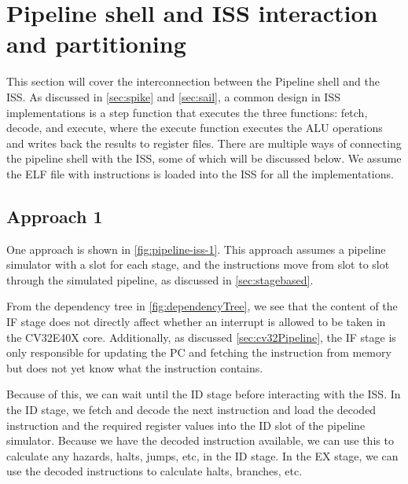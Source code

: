 



\section{Pipeline shell and ISS interaction and partitioning}
\label{sec:shell_iss_interaction}

This section will cover the interconnection between the Pipeline shell and the ISS.
As discussed in \cref{sec:spike} and \cref{sec:sail}, a common design in ISS implementations is a step function that executes the three functions: fetch, decode, and execute, where the execute function executes the ALU operations and writes back the results to register files. There are multiple ways of connecting the pipeline shell with the ISS, some of which will be discussed below. We assume the ELF file with instructions is loaded into the ISS for all the implementations.

\subsection{Approach 1}
\label{sec:app1}

One approach is shown in \cref{fig:pipeline-iss-1}. This approach assumes a pipeline simulator with a slot for each stage, and the instructions move from slot to slot through the simulated pipeline, as discussed in \cref{sec:stagebased}. 

From the dependency tree in \cref{fig:dependencyTree}, we see that the content of the IF stage does not directly affect whether an interrupt is allowed to be taken in the CV32E40X core. Additionally, as discussed \cref{sec:cv32Pipeline}, the IF stage is only responsible for updating the PC and fetching the instruction from memory but does not yet know what the instruction contains.

Because of this, we can wait until the ID stage before interacting with the ISS. In the ID stage, we fetch and decode the next instruction and load the decoded instruction and the required register values into the ID slot of the pipeline simulator. Because we have the decoded instruction available, we can use this to calculate any hazards, halts, jumps, etc, in the ID stage. In the EX stage, we can use the decoded instructions to calculate halts, branches, etc. 

